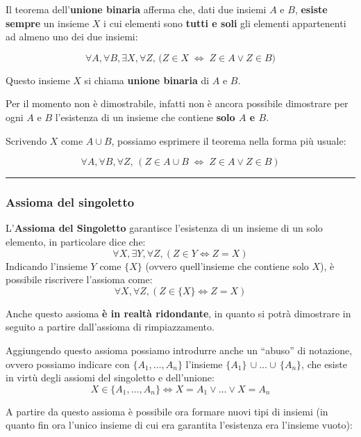 \documentclass[
  a4paper,
]{article}
\begin{document}
Il teorema dell'\textbf{unione binaria} afferma che, dati due insiemi
\(A\) e \(B\), \textbf{esiste sempre} un insieme \(X\) i cui elementi
sono \textbf{tutti e soli} gli elementi appartenenti ad almeno uno dei
due insiemi:

\[
\forall A, \forall B, \exists X, \forall Z, \, \big( Z \in X \;\Longleftrightarrow\; Z \in A \lor Z \in B \big)
\]

Questo insieme \(X\) si chiama \textbf{unione binaria} di \(A\) e \(B\).

Per il momento non è dimostrabile, infatti non è ancora possibile
dimostrare per ogni \(A\) e \(B\) l'esistenza di un insieme che contiene
\textbf{solo \(A\) e \(B\)}.

Scrivendo \(X\) come \(A\cup B\), possiamo esprimere il teorema nella
forma più usuale:

\[
\forall A, \forall B, \forall Z, \, (Z \in A \cup B \;\Longleftrightarrow\; Z \in A \lor Z \in B)
\]

\par\noindent\rule{\linewidth}{0.4pt}\par\vspace{6pt}

\hypertarget{assioma-del-singoletto}{%
\subsubsection{Assioma del singoletto}\label{assioma-del-singoletto}}

L'\textbf{Assioma del Singoletto} garantisce l'esistenza di un insieme
di un solo elemento, in particolare dice che: \[
\forall X, \exists Y, \forall Z, (Z \in Y \iff Z = X)
\] Indicando l'insieme \(Y\) come \(\{X\}\) (ovvero quell'insieme che
contiene solo \(X\)), è possibile riscrivere l'assioma come: \[
\forall X, \forall Z, (Z \in \{X\} \iff Z = X)
\]

Anche questo assioma \textbf{è in realtà ridondante}, in quanto si potrà
dimostrare in seguito a partire dall'assioma di rimpiazzamento.

Aggiungendo questo assioma possiamo introdurre anche un ``abuso'' di
notazione, ovvero possiamo indicare con \(\{A_1, \dots , A_n\}\)
l'insieme \(\{A_1\} \, \cup \dots \cup \, \{A_n\}\), che esiste in virtù
degli assiomi del singoletto e dell'unione: \[
X \in \{A_1, \dots , A_n\} \iff X = A_1 \lor \dots \lor X = A_n
\]

A partire da questo assioma è possibile ora formare nuovi tipi di
insiemi (in quanto fin ora l'unico insieme di cui era garantita
l'esistenza era l'insieme vuoto):
\end{document}
